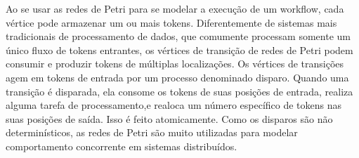	
	Ao se usar as redes de Petri para se modelar a execução de um workflow, cada
vértice pode armazenar um ou mais tokens. Diferentemente de sistemas mais tradicionais de processamento de dados, que comumente processam somente um único
fluxo de tokens entrantes, os vértices de transição de redes de Petri podem consumir e produzir tokens de múltiplas localizações. Os vértices de transições agem em tokens de entrada por um processo denominado disparo. Quando uma transição é disparada, ela consome os tokens de suas posições de entrada, realiza alguma tarefa de processamento,e realoca um número específico de tokens nas suas posições de saída. Isso é feito atomicamente. Como os disparos são não determinísticos, as redes de Petri são muito utilizadas para modelar comportamento concorrente em sistemas distribuídos.

